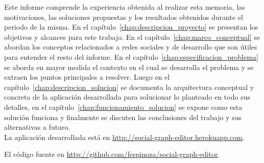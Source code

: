 \begin{intro}
  Este informe comprende la experiencia obtenida al realizar esta memoria, las motivaciones, las soluciones propuestas y los resultados obtenidos durante el periodo de la misma. En el capítulo~\ref{chap:descripcion_proyecto} se presentan los objetivos y alcances para este trabajo. En el capítulo~\ref{chap:marco_conceptual} se abordan los conceptos relacionados a redes sociales y de desarrollo que son útiles para entender el resto del informe. En el capítulo~\ref{chap:especificacion_problema} se aborda en mayor medida el contexto en el cual se desarrolla el problema y se extraen los puntos principales a resolver. Luego en el capítulo~\ref{chap:descripcion_solucion} se documenta la arquitectura conceptual y concreta de la aplicación desarrollada para solucionar lo planteado en todo sus detalles, en el capítulo~\ref{chap:funcionamiento_solucion} se expone como esta solución funciona y finalmente se discuten las conclusiones del trabajo y sus alternativas a futuro.\\
  
  La aplicación desarrollada está en \url{http://social-graph-editor.herokuapp.com}.
  
  El código fuente en \url{http://github.com/fespinoza/social-graph-editor}.
  
\end{intro}